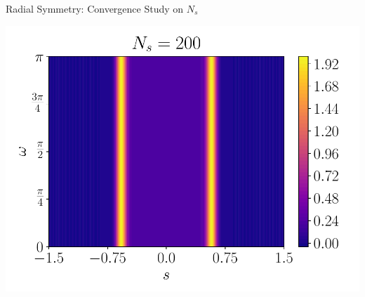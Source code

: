 \documentclass{beamer}
\begin{document}
\begin{frame}{Radial Symmetry: Convergence Study on $N_s$}
{\begin{minipage}{0.38\linewidth}
	\end{minipage}
	\hspace{-0.25cm}
	\begin{minipage}{0.38\linewidth}
		\includegraphics[width=\linewidth]{figures/Radon_Solution_Symmetric_200.pdf} 
	\end{minipage}
	}
\end{frame}
\end{document}
